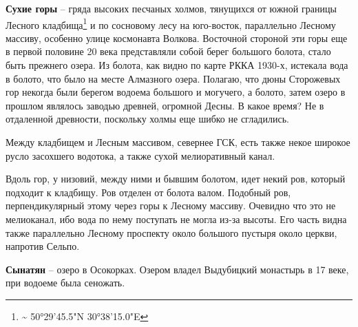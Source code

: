 

\textbf{Сухие горы} – гряда высоких песчаных холмов, тянущихся от южной границы Лесного кладбища\footnote{\textasciitilde{} 50°29'45.5"N 30°38'15.0"E} и по сосновому лесу на юго-восток, параллельно Лесному массиву, особенно улице космонавта Волкова. Восточной стороной эти горы еще в первой половине 20 века представляли собой берег большого болота, стало быть прежнего озера. Из болота, как видно по карте РККА 1930-х, истекала вода в болото, что было на месте Алмазного озера. Полагаю, что дюны Сторожевых гор некогда были берегом водоема большого и могучего, а болото, затем озеро в прошлом являлось заводью древней, огромной Десны. В какое время? Не в отдаленной древности, поскольку холмы еще шибко не сгладились.

Между кладбищем и Лесным массивом, севернее ГСК, есть также некое широкое русло засохшего водотока, а также сухой мелиоративный канал. 

Вдоль гор, у низовий, между ними и бывшим болотом, идет некий ров, который подходит к кладбищу. Ров отделен от болота валом. 
Подобный ров, перпендикулярный этому через горы к Лесному массиву. Очевидно что это не мелиоканал, ибо вода по нему поступать не могла из-за высоты. Его часть видна также параллельно Лесному проспекту около большого пустыря около церкви, напротив Сельпо.\\

\medskip
 
\textbf{Сынатян} – озеро в Осокорках. Озером владел Выдубицкий монастырь в 17 веке, при водоеме была сеножать.\\
